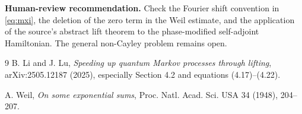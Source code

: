 \documentclass[10pt]{article}
\begin{document}
\textbf{Human-review recommendation.} Check the Fourier shift convention in
\eqref{eq:mxi}, the deletion of the zero term in the Weil estimate, and the
application of the source's abstract lift theorem to the phase-modified
self-adjoint Hamiltonian.  The general non-Cayley problem remains open.

\begin{thebibliography}{9}
B. Li and J. Lu,
\emph{Speeding up quantum Markov processes through lifting},
arXiv:2505.12187 (2025), especially Section 4.2 and equations (4.17)--(4.22).

A. Weil,
\emph{On some exponential sums},
Proc. Natl. Acad. Sci. USA 34 (1948), 204--207.
\end{thebibliography}
\end{document}

